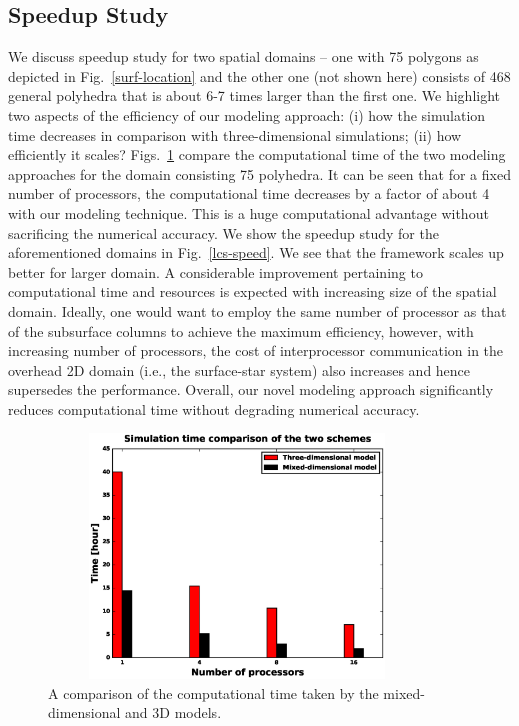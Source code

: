 \documentclass[review]{elsarticle}
\begin{document}
\subsection{Speedup Study}
We discuss speedup study for two spatial domains -- one with 75 polygons as depicted in Fig.~\ref{surf-location} and the other one (not shown here) consists of 468 general polyhedra that is about 6-7 times larger than the first one. We highlight two aspects of the efficiency of our modeling approach: (i) how the simulation time decreases in comparison with three-dimensional simulations; (ii) how efficiently it scales? Figs.~\ref{3d-lcs-speed} compare the computational time of the two modeling approaches for the domain consisting 75 polyhedra.
It can be seen that for a fixed number of processors, the computational time decreases by a factor of about 4 with our modeling technique. This is a huge computational advantage without sacrificing the numerical accuracy. We show the speedup study for the aforementioned domains in Fig.~\ref{lcs-speed}. We see that the framework scales up better for larger domain. A considerable improvement pertaining to computational time and resources is expected with increasing size of the spatial domain. Ideally, one would want to employ the same number of processor as that of the subsurface columns to achieve the maximum efficiency, however, with increasing number of processors, the cost of interprocessor communication in the overhead 2D domain (i.e., the surface-star system) also increases and hence supersedes the performance. Overall, our novel modeling approach significantly reduces computational time without degrading numerical accuracy.
 
\begin{figure}[!htpb]
\centering
\includegraphics[height = 6.5cm, width=10cm]{figures/compare3d-lcs-speed.eps}
\caption{A comparison of the computational time taken by the mixed-dimensional and 3D models.}
\label{3d-lcs-speed}
\end{figure}
\end{document}
